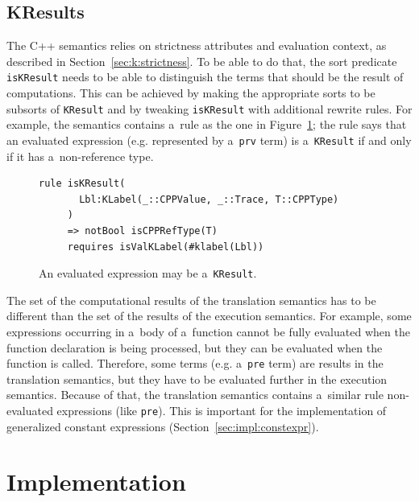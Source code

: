 \documentclass[nolot,nolof,nocover,printed]{fithesis3}
\newcommand{\Project}{Project\xspace}
\begin{document}

\section{KResults}\label{sec:proj:kresults}

The C++ semantics relies on strictness attributes and evaluation context, as described in Section~\ref{sec:k:strictness}. To be able to do that, the sort predicate \lstinline|isKResult| needs to be able to distinguish the terms that should be the result of computations. This can be achieved by making the appropriate sorts to be subsorts of \lstinline|KResult| and by tweaking \lstinline|isKResult| with additional rewrite rules. For example, the semantics contains a~rule as the one in Figure~\ref{lst:evalExprIsKResult}; the rule says that an evaluated expression (e.g. represented by a~\lstinline|prv| term) is a~\lstinline|KResult| if and only if it has a~non-reference type.

\begin{figure}[ht]
\begin{lstlisting}
rule isKResult(
       Lbl:KLabel(_::CPPValue, _::Trace, T::CPPType)
     )
     => notBool isCPPRefType(T)
     requires isValKLabel(#klabel(Lbl))
\end{lstlisting}
\caption{An evaluated expression may be a~\lstinline|KResult|.}
\label{lst:evalExprIsKResult}
\end{figure}

The set of the computational results of the translation semantics has to be different than the set of the results of the execution semantics. For example, some expressions occurring in a~body of a~function cannot be fully evaluated when the function declaration is being processed, but they can be evaluated when the function is called. Therefore, some terms (e.g. a~\lstinline|pre| term) are results in the translation semantics, but they have to be evaluated further in the execution semantics. Because of that, the translation semantics contains a~similar rule non-evaluated expressions (like \lstinline|pre|). This is important for the implementation of generalized constant expressions (Section~\ref{sec:impl:constexpr}).




\chapter{Implementation}\label{chap:implement}
\end{document}
